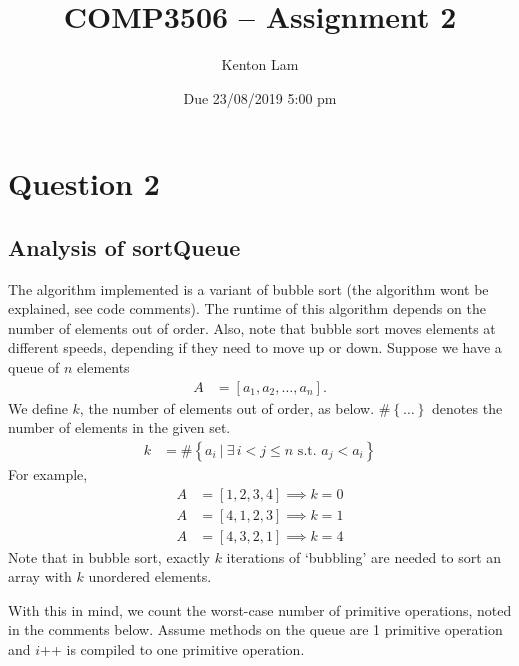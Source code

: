 \documentclass[11pt,a4paper]{article} %
\author{Kenton Lam}
\date{{Due 23/08/2019 5:00 pm}}
\title{COMP3506 -- Assignment 2}
\begin{document}
%

\setcounter{page}{1}
\maketitle
\section*{Question 2}
\subsection*{Analysis of {sortQueue}}

The algorithm implemented is a variant of bubble sort (the algorithm wont be
explained, see code comments). The runtime of this algorithm depends on the number
of elements out of order. Also, note that bubble sort moves elements at different speeds,
depending if they need to move up or down. Suppose we have a queue of $n$ elements
\begin{align*}
    A &= \left[ a_1, a_2, \ldots, a_n \right].
\end{align*}
We define $k$, the number of elements 
out of order, as below. $\# \left\{ \ldots\right\}$ denotes the number of elements in the given set.
\begin{align*}
    k &= \# \left\{a_i ~|~ \exists\, i < j \le n \text{ s.t. } a_j < a_i\right\}
\end{align*}
For example, 
\begin{align*}
    A &= \left[ 1, 2, 3, 4 \right] \implies k = 0 \\ 
    A &= \left[ 4, 1, 2, 3 \right] \implies k = 1 \\ 
    A &= \left[ 4, 3, 2, 1 \right] \implies k = 4
\end{align*}
Note that in bubble sort, exactly $k$ iterations of `bubbling' are needed to sort
an array with $k$ unordered elements.

With this in mind, we count the worst-case number of primitive operations,
noted in the comments below. Assume methods on the queue are 1 primitive operation and 
$i$++ is compiled to one primitive operation.
\end{document}
